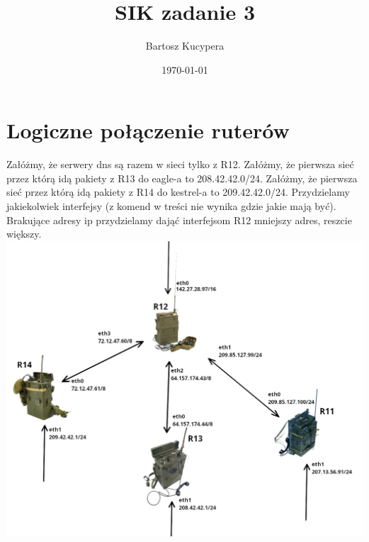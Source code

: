 \documentclass{article}
\title{SIK zadanie 3}
\author{Bartosz Kucypera}
\date{\today}
\begin{document}
\maketitle

\section*{Logiczne połączenie ruterów}
Załóżmy, że serwery dns są razem w sieci tylko z R12. \newline
Załóżmy, że pierwsza sieć przez którą idą pakiety z R13 do eagle-a to 208.42.42.0/24. \newline
Załóżmy, że pierwsza sieć przez którą idą pakiety z R14 do kestrel-a to 209.42.42.0/24. \newline
Przydzielamy jakiekolwiek interfejsy (z komend w treści nie wynika gdzie jakie mają być). \\
Brakujące adresy ip przydzielamy dająć interfejsom R12 mniejszy adres, reszcie większy. \\

\includegraphics[width=\linewidth]{sieci.png}
\newpage
\end{document}

